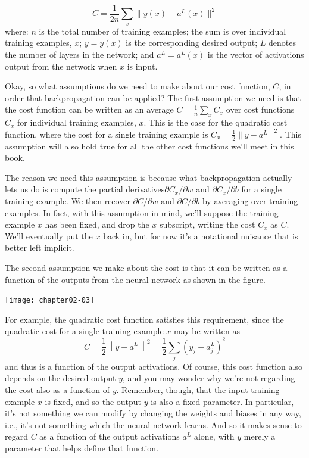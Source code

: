 \begin{equation}
C=\frac{1}{2 n} \sum_{x}\parallel y(x)-a^{L}(x)\parallel ^{2}
\label{eq:c02-26}
\end{equation}
where: $n$ is the total number of training examples; the sum is over individual training examples, $x$; $y=y(x)$ is the corresponding desired output; $L$ denotes the number of layers in the network; and $a^L=a^L(x)$ is the vector of activations output from the network when $x$ is input.

Okay, so what assumptions do we need to make about our cost function, $C$, in order that backpropagation can be applied? The first assumption we need is that the cost function can be written as an average $C=\frac{1}{n} \sum_{x} C_{x}$ over cost functions $C_x$ for individual training examples, $x$. This is the case for the quadratic cost function, where the cost for a single training example is  
$C_{x}=\frac{1}{2}\parallel y-a^{L}\parallel^{2}$.  This assumption will also hold true for all the other cost functions we'll meet in this book.

The reason we need this assumption is because what backpropagation actually lets us do is compute the partial derivatives$\partial C_{x} / \partial w$ and $\partial C_{x} / \partial b$ for a single training example. We then recover $\partial C / \partial w$ and $\partial C / \partial b$ by averaging over training examples. In fact, with this assumption in mind, we'll suppose the training example $x$ has been fixed, and drop the $x$ subscript, writing the cost $C_x$ as $C$. We'll eventually put the $x$ back in, but for now it's a notational nuisance that is better left implicit.

The second assumption we make about the cost is that it can be written as a function of the outputs from the neural network as shown in the figure.
\begin{marginfigure}
\texttt{[image: chapter02-03]}
\end{marginfigure}


For example, the quadratic cost function satisfies this requirement, since the quadratic cost for a single training example $x$ may be written as 
\begin{equation}
C=\frac{1}{2}\left\|y-a^{L}\right\|^{2}=\frac{1}{2} \sum_{j}\left(y_{j}-a_{j}^{L}\right)^{2}
\label{eq:c02-27}
\end{equation}
and thus is a function of the output activations. Of course, this cost function also depends on the desired output $y$, and you may wonder why we're not regarding the cost also as a function of $y$. Remember, though, that the input training example $x$ is fixed, and so the output $y$ is also a fixed parameter. In particular, it's not something we can modify by changing the weights and biases in any way, i.e., it's not something which the neural network learns. And so it makes sense to regard $C$ as a function of the output activations $a^L$ alone, with $y$ merely a parameter that helps define that function.


